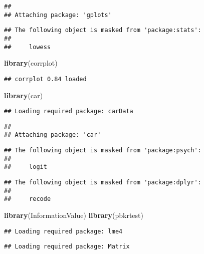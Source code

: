 \documentclass[]{article}
\newenvironment{Shaded}{\begin{snugshade}}{\end{snugshade}}
\newcommand{\KeywordTok}[1]{\textcolor[rgb]{0.13,0.29,0.53}{\textbf{#1}}}
\newcommand{\NormalTok}[1]{#1}
\begin{document}
\begin{verbatim}
## 
## Attaching package: 'gplots'
\end{verbatim}

\begin{verbatim}
## The following object is masked from 'package:stats':
## 
##     lowess
\end{verbatim}

\begin{Shaded}
\begin{Highlighting}[]
\KeywordTok{library}\NormalTok{(corrplot)}
\end{Highlighting}
\end{Shaded}

\begin{verbatim}
## corrplot 0.84 loaded
\end{verbatim}

\begin{Shaded}
\begin{Highlighting}[]
\KeywordTok{library}\NormalTok{(car)}
\end{Highlighting}
\end{Shaded}

\begin{verbatim}
## Loading required package: carData
\end{verbatim}

\begin{verbatim}
## 
## Attaching package: 'car'
\end{verbatim}

\begin{verbatim}
## The following object is masked from 'package:psych':
## 
##     logit
\end{verbatim}

\begin{verbatim}
## The following object is masked from 'package:dplyr':
## 
##     recode
\end{verbatim}

\begin{Shaded}
\begin{Highlighting}[]
\KeywordTok{library}\NormalTok{(InformationValue)}
\KeywordTok{library}\NormalTok{(pbkrtest)}
\end{Highlighting}
\end{Shaded}

\begin{verbatim}
## Loading required package: lme4
\end{verbatim}

\begin{verbatim}
## Loading required package: Matrix
\end{verbatim}
\end{document}
